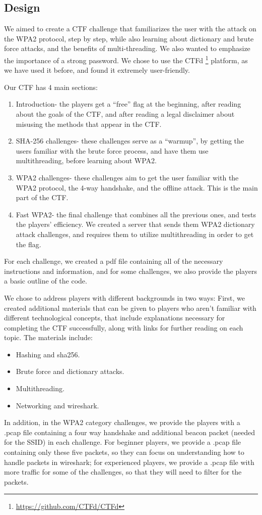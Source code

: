 \documentclass[sigconf]{acmart}
\begin{document}
\subsection{Design}

We aimed to create a CTF challenge that familiarizes the user with the attack on the WPA2 protocol, step by step, while also learning about dictionary and brute force attacks, and the benefits of multi-threading. We also wanted to emphasize the importance of a strong password. We chose to use the CTFd \footnote{\hyperlink{https://github.com/CTFd/CTFd}{https://github.com/CTFd/CTFd}} platform, as we have used it before, and found it extremely user-friendly. 

Our CTF has 4 main sections:
\begin{enumerate}
\item Introduction- the players get a “free” flag at the beginning, after reading about the goals of the CTF, and after reading a legal disclaimer about misusing the methods that appear in the CTF.
\item SHA-256 challenges- these challenges serve as a “warmup”, by getting the users familiar with the brute force process, and have them use multithreading, before learning about WPA2.
\item WPA2 challenges- these challenges aim to get the user familiar with the WPA2 protocol, the 4-way handshake, and the offline attack. This is the main part of the CTF.
\item Fast WPA2- the final challenge that combines all the previous ones, and tests the players’ efficiency. We created a server that sends them WPA2 dictionary attack challenges, and requires them to utilize multithreading in order to get the flag.
\end{enumerate}

For each challenge, we created a pdf file containing all of the necessary instructions and information, and for some challenges, we also provide the players a basic outline of the code.

We chose to address players with different backgrounds in two ways: First, we created additional materials that can be given to players who aren't familiar with different technological concepts, that include explanations necessary for completing the CTF successfully, along with links for further reading on each topic. The materials include:
\begin{itemize}
\item Hashing and sha256.
\item Brute force and dictionary attacks.
\item Multithreading.
\item Networking and wireshark.
\end{itemize}
In addition, in the WPA2 category challenges, we provide the players with a .pcap file containing a four way handshake and additional beacon packet (needed for the SSID) in each challenge. For beginner players, we provide a .pcap file containing only these five packets, so they can focus on understanding how to handle packets in wireshark; for experienced players, we provide a .pcap file with more traffic for some of the challenges, so that they will need to filter for the packets.
\end{document}
